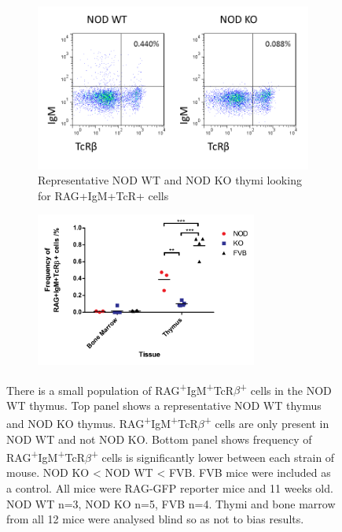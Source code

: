 \begin{figure}
	\begin{subfigure}{\textwidth}
	\includegraphics[width=\textwidth]{Figures/ThyRAGIgMTcR.png}
	\caption{Representative NOD WT and NOD KO thymi looking for RAG+IgM+TcR+ cells}
	\label{subfig:BMvThyRAGIgMTcR}
	\end{subfigure}
	\begin{subfigure}{\textwidth}
	\centering
	\includegraphics[width=0.8\textwidth]{Figures/IgMTcRposgraph.pdf}
	\caption{}
	\label{subfig:IgMTcRposgraph}
	\end{subfigure}
\caption{There is a small population of RAG\textsuperscript{+}IgM\textsuperscript{+}TcR$\beta$\textsuperscript{+} cells in the NOD WT thymus. 
Top panel shows a representative NOD WT thymus and NOD KO thymus.
RAG\textsuperscript{+}IgM\textsuperscript{+}TcR$\beta$\textsuperscript{+} cells are only present in NOD WT and not NOD KO.
Bottom panel shows frequency of RAG\textsuperscript{+}IgM\textsuperscript{+}TcR$\beta$\textsuperscript{+} cells is significantly lower between each strain of mouse. NOD KO < NOD WT < FVB. FVB mice were included as a control.
All mice were RAG-GFP reporter mice and 11 weeks old. NOD WT n=3, NOD KO n=5, FVB n=4.
Thymi and bone marrow from all 12 mice were analysed blind so as not to bias results.}
\label{fig:RAGIgMTcRpos}
\end{figure}

